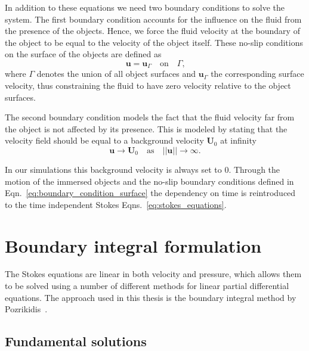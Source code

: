 In addition to these equations we need two boundary conditions to solve the system. The first boundary condition accounts for the influence on the fluid from the presence of the objects. Hence, we force the fluid velocity at the boundary of the object to be equal to the velocity of the object itself. These no-slip conditions on the surface of the objects are defined as
\begin{equation}
  \label{eq:boundary_condition_surface}
  \mathbf{u} = \mathbf{u}_\Gamma  \quad \text{on} \quad  \Gamma \text{,}
\end{equation}
where $\Gamma$ denotes the union of all object surfaces and $\mathbf{u}_\Gamma$ the corresponding surface velocity, thus constraining the fluid to have zero velocity relative to the object surfaces.

The second boundary condition models the fact that the fluid velocity far from the object is not affected by its presence. This is modeled by stating that the velocity field should be equal to a background velocity $\mathbf{U}_0$ at infinity
\begin{equation}
  \label{eq:boundary_condition_background}
  \mathbf{u} \rightarrow \mathbf{U}_0 \quad \text{as} \quad ||\mathbf{u}|| \rightarrow \infty \text{.}
\end{equation}

In our simulations this background velocity is always set to $0$. Through the motion of the immersed objects and the no-slip boundary conditions defined in Eqn.~\eqref{eq:boundary_condition_surface} the dependency on time is reintroduced to the time independent Stokes Eqns.~\eqref{eq:stokes_equations}.

\section{Boundary integral formulation}
\label{sec:boundary_integral_formulation}

The Stokes equations are linear in both velocity and pressure, which allows them to be solved using a number of different methods for linear partial differential equations. The approach used in this thesis is the boundary integral method by Pozrikidis~\cite{Pozrikidis1992}.

\subsection{Fundamental solutions}
\label{subsec:fundamental_solutions}

